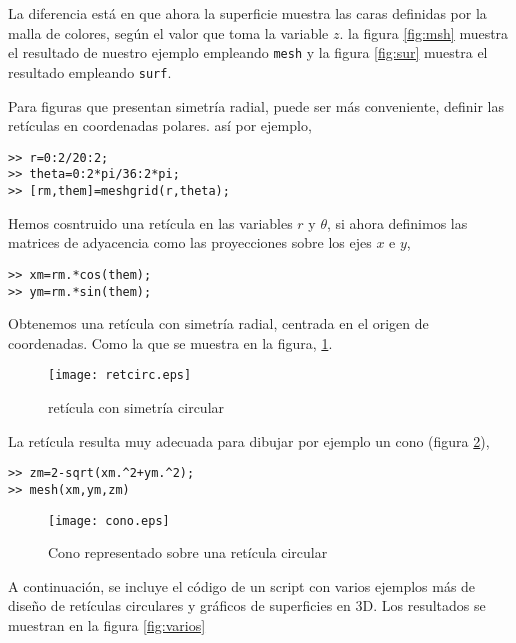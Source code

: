 La diferencia está en que ahora la superficie muestra las caras definidas por la malla de colores, según el valor que toma la variable $z$. la figura \ref{fig:msh} muestra el resultado de nuestro ejemplo empleando \texttt{mesh} y la figura \ref{fig:sur} muestra el resultado empleando \texttt{surf}.



Para figuras que presentan simetría radial, puede ser más conveniente, definir las retículas en coordenadas polares. así por ejemplo,

\begin{verbatim}
>> r=0:2/20:2;
>> theta=0:2*pi/36:2*pi;
>> [rm,them]=meshgrid(r,theta);
\end{verbatim}

Hemos cosntruido una retícula en las variables $r$ y $\theta$, si ahora definimos las matrices de adyacencia como las proyecciones sobre los ejes $x$ e $y$,

\begin{verbatim}
>> xm=rm.*cos(them);
>> ym=rm.*sin(them); 
\end{verbatim}

Obtenemos una retícula con simetría radial, centrada en el origen de coordenadas. Como la que se muestra en la figura, \ref{fig:retcir}.

\begin{figure}[h]
\centering
\texttt{[image: retcirc.eps]}
\caption{retícula con simetría circular}
\label{fig:retcir}
\end{figure}

La retícula resulta muy adecuada para dibujar por ejemplo un cono (figura \ref{fig:cono}),

\begin{verbatim}
>> zm=2-sqrt(xm.^2+ym.^2);
>> mesh(xm,ym,zm)
\end{verbatim}

\begin{figure}[h]
\centering
\texttt{[image: cono.eps]}
\caption{Cono representado sobre una retícula circular}
\label{fig:cono}
\end{figure}

A continuación, se incluye el código de un script con varios ejemplos más de diseño de retículas circulares y gráficos de superficies en 3D. Los resultados se muestran en la figura \ref{fig:varios}


